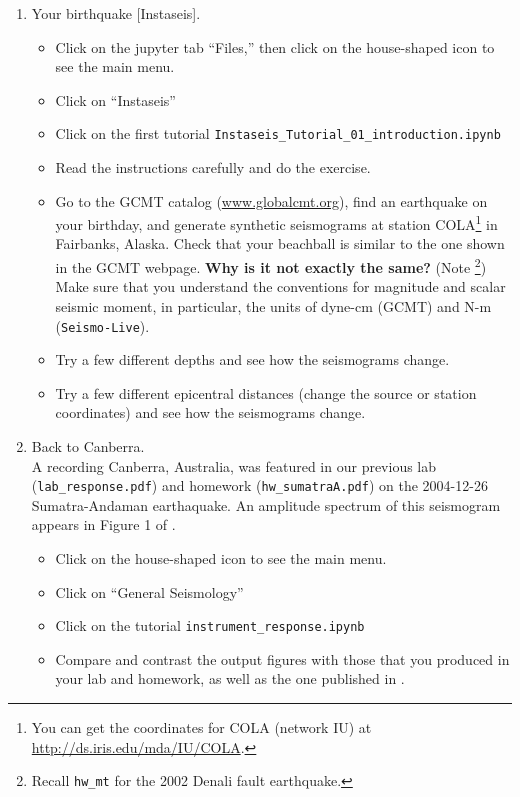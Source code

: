 \documentclass[11pt,titlepage,fleqn]{article}
\newcommand{\slive}{{\tt Seismo-Live}}
\begin{document}
\begin{enumerate}
\item Your birthquake [Instaseis].
\begin{itemize}
\item Click on the jupyter tab ``Files,'' then click on the house-shaped icon to see the main menu.
\item Click on ``Instaseis''
\item Click on the first tutorial \verb+Instaseis_Tutorial_01_introduction.ipynb+
\item Read the instructions carefully and do the exercise.
\item Go to the GCMT catalog (\url{www.globalcmt.org}), find an earthquake on your birthday, and generate synthetic seismograms at station COLA\footnote{You can get the coordinates for COLA (network IU) at \url{http://ds.iris.edu/mda/IU/COLA}.} in Fairbanks, Alaska. Check that your beachball is similar to the one shown in the GCMT webpage. {\bf Why is it not exactly the same?} (Note \footnote{Recall {\tt hw\_mt} for the 2002 Denali fault earthquake.}) Make sure that you understand the conventions for magnitude and scalar seismic moment, in particular, the units of dyne-cm (GCMT) and N-m (\slive).
\item Try a few different depths and see how the seismograms change.
\item Try a few different epicentral distances (change the source or station coordinates) and see how the seismograms change.
\end{itemize}

\item Back to Canberra. \\
A recording Canberra, Australia, was featured in our previous lab (\verb+lab_response.pdf+) and homework (\verb+hw_sumatraA.pdf+) on the 2004-12-26  Sumatra-Andaman earthaquake. An amplitude spectrum of this seismogram appears in Figure 1 of \citet{Park2005}.
\begin{itemize}
\item Click on the house-shaped icon to see the main menu.
\item Click on ``General Seismology''
\item Click on the tutorial \verb+instrument_response.ipynb+
\item Compare and contrast the output figures with those that you produced in your lab and homework, as well as the one published in \citet{Park2005}.
\end{itemize}


\end{enumerate}
\end{document}
